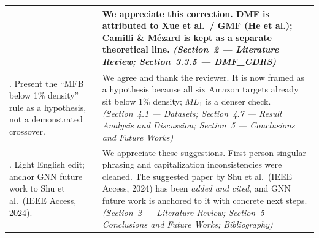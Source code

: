 \documentclass[11pt,a4paper]{article}
\begin{document}
{\begin{longtable}{@{}>{\raggedright\arraybackslash}p{}|>{\raggedright\arraybackslash}p{}@{}}
&
We appreciate this correction. DMF is attributed to Xue et al.\ / GMF (He et al.); Camilli \& M\'ezard is kept as a separate theoretical line.
\textit{(Section~2 --- Literature Review; Section~3.3.5 --- DMF\_CDRS)} \\
\midrule
6. Present the ``MFB below 1\% density'' rule as a hypothesis, not a demonstrated crossover.
&
We agree and thank the reviewer. It is now framed as a hypothesis because all six Amazon targets already sit below 1\% density; $ML_1$ is a denser check.
\textit{(Section~4.1 --- Datasets; Section~4.7 --- Result Analysis and Discussion; Section~5 --- Conclusions and Future Works)} \\
\midrule
7. Light English edit; anchor GNN future work to Shu et al.\ (IEEE Access, 2024).
&
We appreciate these suggestions. First-person-singular phrasing and capitalization inconsistencies were cleaned. The suggested paper by Shu et al.\ (IEEE Access, 2024) has been \emph{added and cited}, and GNN future work is anchored to it with concrete next steps.
\textit{(Section~2 --- Literature Review; Section~5 --- Conclusions and Future Works; Bibliography)} \\
\bottomrule
\end{longtable}
}

\end{document}
